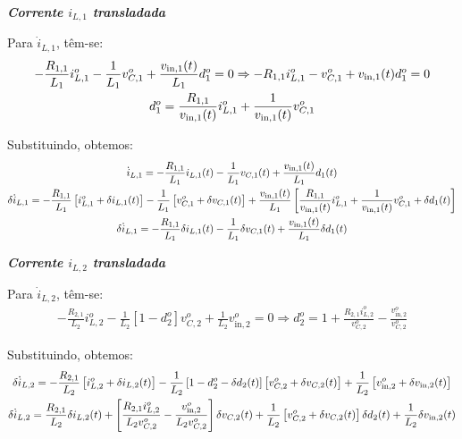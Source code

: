 \documentclass{article}
\newcommand{\nle}{%
  \notag \\[0pt]
}
\begin{document}
\textbf{\textit{Corrente $i_{L,1}$ transladada}} \vspace*{12pt}

Para $\dot{i}_{L,1}$, têm-se:
\begin{gather}
  - \frac{R_{1,1}}{L_1} i_{L,1}^o - \frac{1}{L_1} v_{C,1}^o + \frac{v_{\text{in}, 1}(t)}{L_1} d_1^o = 0 \Rightarrow
  - R_{1,1} i_{L,1}^o - v_{C,1}^o + v_{\text{in}, 1}(t) d_1^o = 0 \nle
  d_1^o = \frac{R_{1,1}}{v_{\text{in}, 1}(t)} i_{L,1}^o + \frac{1}{v_{\text{in}, 1}(t)} v_{C,1}^o
\end{gather}

Substituindo, obtemos:
\begin{gather}
  \dot{i}_{L,1} = - \frac{R_{1,1}}{L_1} i_{L,1}(t) - \frac{1}{L_1} v_{C,1}(t) + \frac{v_{\text{in}, 1}(t)}{L_1} d_1(t) \nle
  \delta \dot{i}_{L,1} = - \frac{R_{1,1}}{L_1} \left[i_{L,1}^o + \delta i_{L,1}(t)\right]
  - \frac{1}{L_1} \left[v_{C,1}^o + \delta v_{C,1}(t)\right]
  + \frac{v_{\text{in}, 1}(t)}{L_1} \left[\frac{R_{1,1}}{v_{\text{in}, 1}(t)} i_{L,1}^o + \frac{1}{v_{\text{in}, 1}(t)} v_{C,1}^o + \delta d_1(t)\right] \nle
  \delta \dot{i}_{L,1} = - \frac{R_{1,1}}{L_1} \delta i_{L,1}(t) - \frac{1}{L_1} \delta v_{C,1}(t) + \frac{v_{\text{in}, 1}(t)}{L_1} \delta d_1(t)
\end{gather}

\textbf{\textit{Corrente $i_{L,2}$ transladada}} \vspace*{12pt}

Para $\dot{i}_{L,2}$, têm-se:
\begin{gather}
  - \frac{R_{2,1}}{L_2} i_{L,2}^o - \frac{1}{L_2} \left[1 - d_2^o\right] v_{C,2}^o + \frac{1}{L_2} v_{\text{in},2}^o = 0 \Rightarrow
  d_2^o = 1 + \frac{R_{2,1}i_{L,2}^o}{v_{C,2}^o} - \frac{v_{\text{in},2}^o}{v_{C,2}^o}
\end{gather}

Substituindo, obtemos:
\begin{gather}
  \delta \dot{i}_{L,2} = - \frac{R_{2,1}}{L_2} \left[i_{L,2}^o + \delta i_{L,2}(t)\right] - \frac{1}{L_2} \left[1 - d_2^o - \delta d_2(t)\right] \left[v_{C,2}^o + \delta v_{C,2}(t)\right] + \frac{1}{L_2} \left[v_{\text{in},2}^o + \delta v_{\text{in},2}(t)\right] \nle
  \delta \dot{i}_{L,2} = \frac{R_{2,1}}{L_2} \delta i_{L,2}(t)
  + \left[\frac{R_{2,1} i_{L,2}^o}{L_2 v_{C,2}^o} - \frac{v_{\text{in},2}^o}{L_2 v_{C,2}^o}\right] \delta v_{C,2}(t) + \frac{1}{L_2} \left[v_{C,2}^o + \delta v_{C,2}(t)\right] \delta d_2(t) + \frac{1}{L_2} \delta v_{\text{in},2}(t)
\end{gather}
\end{document}
